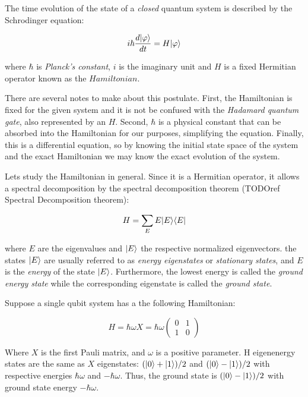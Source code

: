 \begin{postulate 3'}
	The time evolution of the state of a \emph{closed} quantum system is described by the Schrodinger equation:
	
	$$ i \hbar \frac{d|\varphi\rangle}{dt} = H|\varphi\rangle $$
	
	where $\hbar$ is \emph{Planck’s constant}, $i$ is the imaginary unit and $H$ is a fixed Hermitian operator known as the $Hamiltonian$.
\end{postulate 3'}

There are several notes to make about this postulate. First, the Hamiltonian is fixed for the given system and it is not be confused with the \emph{Hadamard quantum gate}, also represented by an $H$. Second, $\hbar$ is a physical constant that can be absorbed into the Hamiltonian for our purposes, simplifying the equation. Finally, this is a differential equation, so by knowing the initial state space of the system and the exact Hamiltonian we may know the exact evolution of the system.

Lets study the Hamiltonian in general. Since it is a Hermitian operator, it allows a spectral decomposition by the spectral decomposition theorem (TODOref Spectral Decomposition theorem):

$$ H = \sum_E E |E\rangle\langle E| $$

where $E$ are the eigenvalues and $|E\rangle$ the respective normalized eigenvectors. the states $|E\rangle$ are usually referred to as \emph{energy eigenstates} or \emph{stationary states}, and $E$ is the \emph{energy} of the state $|E\rangle$. Furthermore, the lowest energy is called the \emph{ground energy state} while the corresponding eigenstate is called the \emph{ground state}.

\begin{exampleth} Suppose a single qubit system has a the following Hamiltonian:
	
	$$ H = \hbar \omega X = \hbar \omega
	\begin{pmatrix}
		0 & 1 \\
		1 & 0 
	\end{pmatrix}
	$$
	
	Where $X$ is the first Pauli matrix, and $\omega$ is a positive parameter. H eigenenergy states are the same as $X$ eigenstates: $(|0\rangle + |1\rangle)/2$ and $(|0\rangle - |1\rangle)/2$ with respective energies $\hbar\omega$ and $-\hbar\omega$. Thus, the ground state is $(|0\rangle - |1\rangle)/2$ with ground state energy $-\hbar\omega$.
\end{exampleth}

